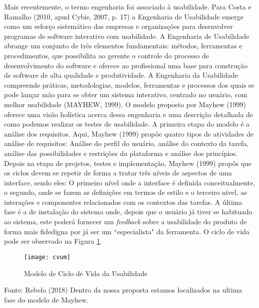Mais recentemente, o termo engenharia foi associado à usabilidade. Para Costa e Ramalho (2010, apud Cybis, 2007, p. 17) a Engenharia de Usabilidade emerge como um esforço sistemático das empresas e organizações para desenvolver programas de software interativo com usabilidade. A Engenharia de Usabilidade abrange um conjunto  de três elementos fundamentais: métodos, ferramentas e procedimentos, que possibilita ao gerente o controle do processo de desenvolvimento do software e oferece ao profissional uma base para construção de software de alta qualidade e produtividade.\newline
\indent A Engenharia da Usabilidade compreende práticas, metodologias, modelos, ferramentas e processos dos quais se pode lançar mão para se obter um sistema interativo, centrado no usuário, com melhor usabilidade (MAYHEW, 1999).\newline
\indent O modelo proposto por Mayhew (1999) oferece uma visão holística acerca dessa engenharia e uma descrição detalhada de como podemos realizar os testes de usabilidade.\newline
\indent A primeira etapa do modelo é a análise dos requisitos. Aqui, Mayhew (1999) propõe quatro tipos de atividades de análise de requisitos:  Análise do perfil do usuário, análise do contexto da tarefa, análise das possibilidades e restrições da plataforma e análise dos princípios.\newline
\indent Depois na etapa de projetos, testes e implementação, Mayhew (1999) propôs que os ciclos devem se repetir de forma a tratar três níveis de aspectos de uma interface, sendo eles: O primeiro nível onde a interface é definida conceitualmente, o segundo, onde se fazem as definições em termos de estilo e o terceiro nível, as interações e componentes relacionados com os contextos das tarefas.\newline
\indent A última fase é a de instalação do sistema onde, depois que o usuário já tiver se habituado ao sistema, este poderá fornecer um \textit{feedback} sobre a usabilidade do produto de forma mais fidedigna por já ser um “especialista" da ferramenta.\newline
\indent O ciclo de  vida pode ser observado na Figura \ref{fig:cvum}.

\begin{figure}[H]
	\centering	
	\caption{Modelo de Ciclo de Vida da Usabilidade}
	\texttt{[image: cvum]}
	\label{fig:cvum}
\end{figure}
Fonte: Rebelo (2018)
\newline
Dentro da nossa proposta estamos localizados na ultima fase do modelo de Mayhew.


